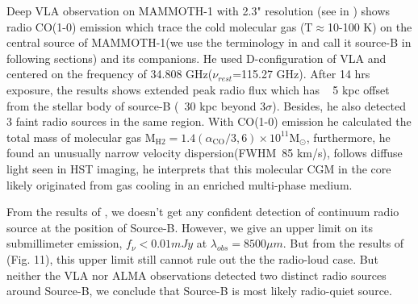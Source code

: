 \documentclass[../Results.tex]{subfiles}
\begin{document}
	Deep VLA observation on MAMMOTH-1 with 2.3" resolution (see in \cite{emonts2019cold}) shows radio CO(1-0) emission which trace the cold molecular gas (T$\approx$10-100 K) on the central source of MAMMOTH-1(we use the terminology in \cite{cai2017discovery} and call it source-B in following sections) and its companions. He used D-configuration of VLA and centered on the frequency of 34.808 GHz($\nu_{rest}$=115.27 GHz). After 14 hrs exposure, the results shows extended peak radio flux which has ~ 5 kpc offset from the stellar body of source-B (~30 kpc beyond 3$\sigma$). Besides, he also detected 3 faint radio sources in the same region. With CO(1-0) emission he calculated the total mass of molecular gas $\mathrm{M}_{\mathrm{H} 2}=1.4\left(\alpha_{\mathrm{CO}} / 3,6\right) \times 10^{11} \mathrm{M}_{\odot}$, furthermore, he found an unusually narrow velocity dispersion(FWHM~85 km/s), follows diffuse light seen in HST imaging, he interprets that this molecular CGM in the core likely originated from gas cooling in an enriched multi-phase medium.
	
	From the results of \cite{emonts2019cold}, we doesn't get any confident detection of continuum radio source at the position of Source-B. However, we give an upper limit on its submillimeter emission, $f_{\nu}<0.01 mJy$ at $\lambda_{obs}=8500 \mu m$. But from the results of \cite{arrigoni2018qso}(Fig. 11), this upper limit still cannot rule out the the radio-loud case. But neither the VLA nor ALMA observations detected two distinct radio sources around Source-B, we conclude that Source-B is most likely radio-quiet source.
\end{document}
